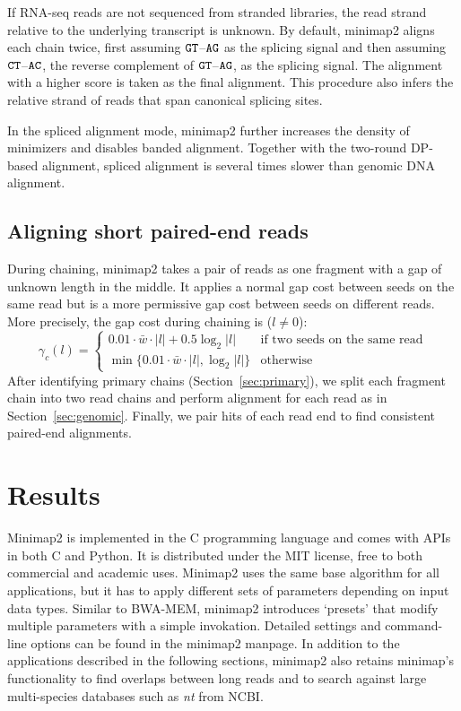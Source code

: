 \documentclass{bioinfo}
\begin{document}
\begin{methods}
If RNA-seq reads are not sequenced from stranded libraries, the read strand
relative to the underlying transcript is unknown. By default, minimap2 aligns
each chain twice, first assuming ${\tt GT}$--${\tt AG}$ as the splicing signal
and then assuming ${\tt CT}$--${\tt AC}$, the reverse complement of ${\tt
GT}$--${\tt AG}$, as the splicing signal. The alignment with a higher score is
taken as the final alignment. This procedure also infers the relative strand of
reads that span canonical splicing sites.

In the spliced alignment mode, minimap2 further increases the density of
minimizers and disables banded alignment. Together with the two-round DP-based
alignment, spliced alignment is several times slower than genomic DNA
alignment.

\subsection{Aligning short paired-end reads}

During chaining, minimap2 takes a pair of reads as one fragment with a gap of
unknown length in the middle. It applies a normal gap cost between seeds on the
same read but is a more permissive gap cost between seeds on different reads.
More precisely, the gap cost during chaining is ($l\not=0$):
\[
\gamma_c(l)=\left\{\begin{array}{ll}
0.01\cdot\bar{w}\cdot |l|+0.5\log_2 |l| & \mbox{if two seeds on the same read} \\
\min\{0.01\cdot\bar{w}\cdot|l|,\log_2|l|\} & \mbox{otherwise}
\end{array}\right.
\]
After identifying primary chains (Section~\ref{sec:primary}), we split each
fragment chain into two read chains and perform alignment for each read as in
Section~\ref{sec:genomic}.  Finally, we pair hits of each read end to find
consistent paired-end alignments.

\end{methods}

\section{Results}

Minimap2 is implemented in the C programming language and comes with APIs in
both C and Python. It is distributed under the MIT license, free to both
commercial and academic uses. Minimap2 uses the same base algorithm for all
applications, but it has to apply different sets of parameters depending on
input data types. Similar to BWA-MEM, minimap2 introduces `presets' that
modify multiple parameters with a simple invokation. Detailed settings
and command-line options can be found in the minimap2 manpage. In addition to
the applications described in the following sections, minimap2 also retains
minimap's functionality to find overlaps between long reads and to search
against large multi-species databases such as \emph{nt} from NCBI.
\end{document}
